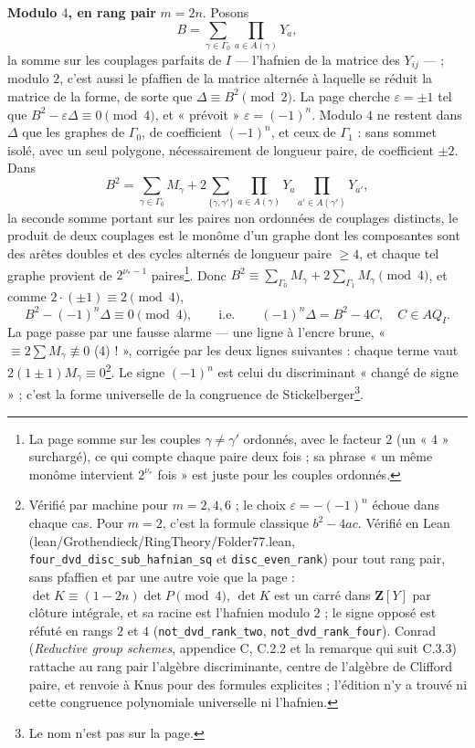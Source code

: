 \documentclass[11pt,a4paper]{article}
\begin{document}
\textbf{Modulo $4$, en rang pair} $m = 2n$. Posons
\[
  B = \sum_{\gamma \in \Gamma_0} \prod_{a \in A(\gamma)} Y_a ,
\]
la somme sur les couplages parfaits de $I$ — l'hafnien de la matrice des $Y_{ij}$
— ; modulo $2$, c'est aussi le pfaffien de la matrice alternée à laquelle se réduit
la matrice de la forme, de sorte que $\Delta \equiv B^2 \pmod 2$. La page cherche
$\varepsilon = \pm 1$ tel que $B^2 - \varepsilon\Delta \equiv 0 \pmod 4$, et
« prévoit » $\varepsilon = (-1)^n$. Modulo $4$ ne restent dans $\Delta$ que les
graphes de $\Gamma_0$, de coefficient $(-1)^n$, et ceux de $\Gamma_1$ : sans sommet
isolé, avec un seul polygone, nécessairement de longueur paire, de coefficient
$\pm 2$. Dans
\[
  B^2 = \sum_{\gamma \in \Gamma_0} M_\gamma + 2 \sum_{\{\gamma, \gamma'\}} \prod_{a \in
  A(\gamma)} Y_a \prod_{a' \in A(\gamma')} Y_{a'},
\]
la seconde somme portant sur les paires non ordonnées de couplages distincts, le
produit de deux couplages est le monôme d'un graphe dont les composantes sont des
arêtes doubles et des cycles alternés de longueur paire $\geq 4$, et chaque tel
graphe provient de $2^{\nu_* - 1}$ paires\footnote{La page somme sur les couples
$\gamma \neq \gamma'$ ordonnés, avec le facteur $2$ (un « $4$ » surchargé), ce qui
compte chaque paire deux fois ; sa phrase « un même monôme intervient $2^{\nu_*}$
fois » est juste pour les couples ordonnés.}. Donc $B^2 \equiv \sum_{\Gamma_0}
M_\gamma + 2\sum_{\Gamma_1} M_\gamma \pmod 4$, et comme $2 \cdot (\pm 1) \equiv 2
\pmod 4$,
\[
  B^2 - (-1)^n \Delta \equiv 0 \pmod 4 , \qquad\text{i.e.}\qquad
  (-1)^n \Delta = B^2 - 4C, \quad C \in AQ_I .
\]
La page passe par une fausse alarme — une ligne à l'encre brune, « $\equiv 2\sum
M_\gamma \not\equiv 0$ (4) ! », corrigée par les deux lignes suivantes : chaque terme
vaut $2(1 \pm 1)M_\gamma \equiv 0$\footnote{Vérifié par machine pour $m = 2, 4,
6$ ; le choix $\varepsilon = -(-1)^n$ échoue dans chaque cas. Pour $m = 2$, c'est la
formule classique $b^2 - 4ac$. Vérifié en Lean (lean/Grothendieck/RingTheory/Folder77.lean,
\texttt{four\_dvd\_disc\_sub\_hafnian\_sq} et \texttt{disc\_even\_rank}) pour
tout rang pair, sans pfaffien et par une autre voie que la page : $\det K
\equiv (1 - 2n)\det P \pmod 4$, $\det K$ est un carré dans $\mathbf{Z}[Y]$ par
clôture intégrale, et sa racine est l'hafnien modulo $2$ ; le signe opposé est
réfuté en rangs $2$ et $4$ (\texttt{not\_dvd\_rank\_two},
\texttt{not\_dvd\_rank\_four}). Conrad (\emph{Reductive group schemes},
appendice C, C.2.2 et la remarque qui suit C.3.3) rattache au rang pair
l'algèbre discriminante, centre de l'algèbre de Clifford paire, et renvoie à
Knus pour des formules explicites ; l'édition n'y a trouvé ni cette
congruence polynomiale universelle ni l'hafnien.}. Le signe $(-1)^n$ est celui du discriminant
« changé de signe » ; c'est la forme universelle de la congruence de
Stickelberger\footnote{Le nom n'est pas sur la page.}.
\end{document}
